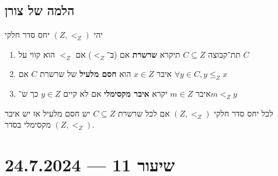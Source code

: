 \subsection{הלמה של צורן}
\begin{definition}
	יהי $(Z, <_Z)$ יחס סדר חלקי
	\begin{enumerate}
		\item תת־קבוצה $C \subseteq Z$ תיקרא \textbf{שרשרת} אם (ב־$<_Z$) אם $<_Z$ הוא קווי על $C$
		\item איבר $x \in Z$ הוא \textbf{חסם מלעיל} של שרשרת $C$ אם $\forall y \in C, y \le_Z x$
		\item איבר $m \in Z$ יקרא \textbf{איבר מקסימלי} אם לא קיים $y \in Z$ כך ש־$m <_Z y$
	\end{enumerate}
\end{definition}
\begin{definition}
	לכל יחס סדר חלקי $(Z, <_Z)$ אם לכל שרשרת $C \subseteq Z$ יש חסם מלעיל אז יש איבר מקסימלי בסדר $(Z, <_Z)$.
\end{definition}

\section{שיעור 11 --- 24.7.2024}
